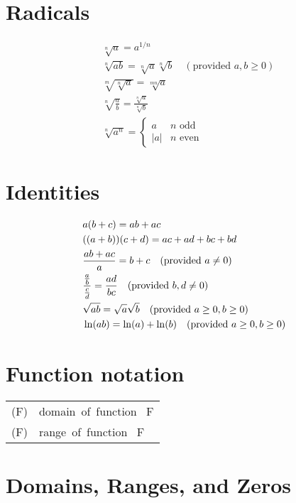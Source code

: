 \documentclass[letterpaper,landscape,9pt,fleqn]{extarticle}
\newcommand{\dom}{\mathrm{dom}}
\newcommand{\range}{\mathrm{range}}
\DeclarePairedDelimiter{\parens}{\lparen}{\rparen}
\begin{document}
\begin{multicols*}{3}
\section*{Radicals}
\begin{alignat*}{2}
&\sqrt[n]{a} = a^{1/n} \\
&\sqrt[n]{ab} = \sqrt[n]{a} \sqrt[n]{b}  \quad (\mbox{provided } a,b \geq 0) \\
&\sqrt[m]{\sqrt[n]{a}} = \sqrt[mn]{a} \\
&\sqrt[n]{\frac{a}{b}} = \frac{\sqrt[n]{a}}{\sqrt[n]{b}} \\
&\sqrt[n]{a^n} = \begin{cases} a & n \mbox{ odd} \\  |a| &  n \mbox{ even} \end{cases}
\end{alignat*}

\section*{Identities}
\begin{alignat*}{2}
   &a  \parens*{b + c} = a b + a c \\
   &\parens*{\parens{a +b}}  \parens*{c + d} = a c + a d + b c + bd \\
   &\frac{a b + ac}{a} = b + c  \quad (\mbox{provided } a \neq 0) \\
   &\frac{\frac{a}{b}}{\frac{c}{d}} = \frac{ad}{b c}  \quad (\mbox{provided } b,d \neq 0) \\
   &\sqrt{a b} = \sqrt{a}\sqrt{b}  \quad (\mbox{provided } a \geq 0, b \geq 0 ) \\
   &\ln(ab) = \ln(a) + \ln(b) \quad (\mbox{provided } a \geq 0, b \geq 0 ) \\
\end{alignat*}

\section*{Function notation}
\begin{tabular}{|L | L|} \hline 
    \dom(F) &   \mbox{domain of function } F \\
    \range(F) &   \mbox{range of function } F \\ \hline
 \end{tabular}

\section*{Domains, Ranges, and Zeros}



\end{multicols*}
\end{document}
